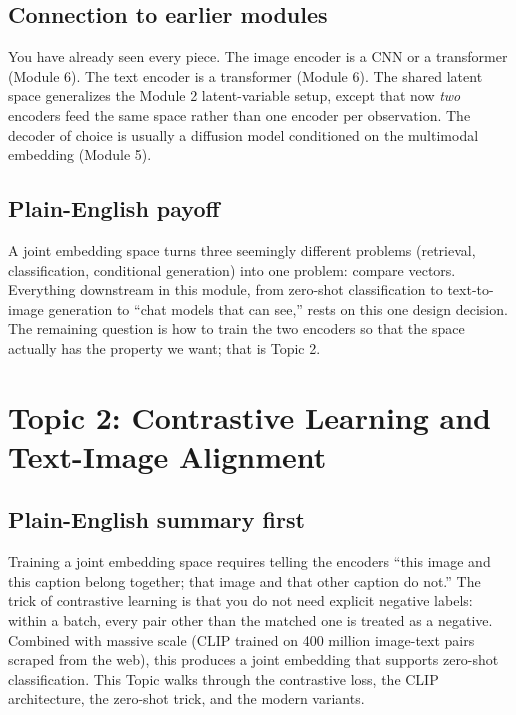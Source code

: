 \documentclass[11pt]{article}
\theoremstyle{remark}
\begin{document}
\subsection{Connection to earlier modules}
You have already seen every piece. The image encoder is a CNN or a transformer (Module 6). The text encoder is a transformer (Module 6). The shared latent space generalizes the Module 2 latent-variable setup, except that now \emph{two} encoders feed the same space rather than one encoder per observation. The decoder of choice is usually a diffusion model conditioned on the multimodal embedding (Module 5).

\subsection*{Plain-English payoff}
A joint embedding space turns three seemingly different problems (retrieval, classification, conditional generation) into one problem: compare vectors. Everything downstream in this module, from zero-shot classification to text-to-image generation to ``chat models that can see,'' rests on this one design decision. The remaining question is how to train the two encoders so that the space actually has the property we want; that is Topic 2.

\section{Topic 2: Contrastive Learning and Text-Image Alignment}

\subsection*{Plain-English summary first}
Training a joint embedding space requires telling the encoders ``this image and this caption belong together; that image and that other caption do not.'' The trick of contrastive learning is that you do not need explicit negative labels: within a batch, every pair other than the matched one is treated as a negative. Combined with massive scale (CLIP trained on 400 million image-text pairs scraped from the web), this produces a joint embedding that supports zero-shot classification. This Topic walks through the contrastive loss, the CLIP architecture, the zero-shot trick, and the modern variants.
\end{document}
